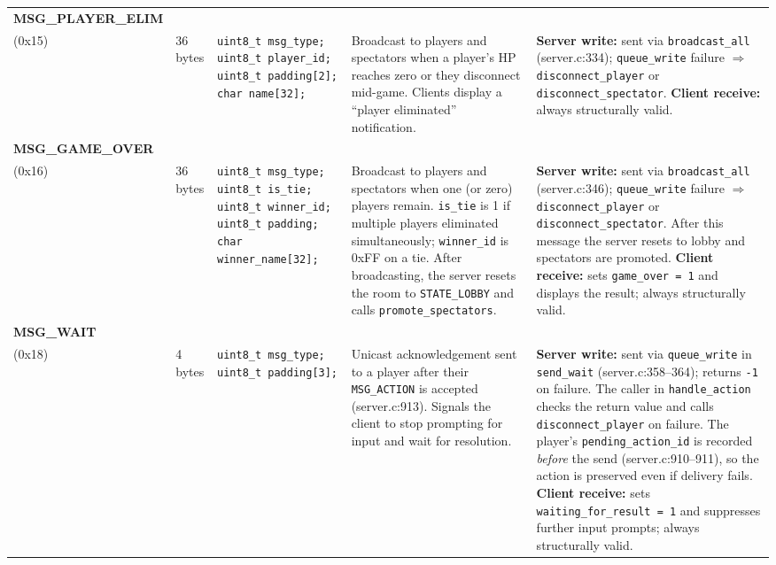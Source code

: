 \documentclass[11pt,letterpaper]{article}
\begin{document}
\begin{longtable}{@{}p{1.8cm} p{1.2cm} p{2.4cm} p{4.2cm} p{4.8cm}@{}}
\textbf{MSG\_PLAYER\_ELIM}\\(0x15) &
36 bytes &
\texttt{uint8\_t msg\_type;}\newline
\texttt{uint8\_t player\_id;}\newline
\texttt{uint8\_t padding[2];}\newline
\texttt{char name[32];} &
Broadcast to players and spectators when a player's HP reaches zero or they disconnect mid-game. Clients display a ``player eliminated'' notification. &
\textbf{Server write:} sent via \texttt{broadcast\_all} (server.c:334); \texttt{queue\_write} failure $\Rightarrow$ \texttt{disconnect\_player} or \texttt{disconnect\_spectator}. \textbf{Client receive:} always structurally valid. \\[4pt]

\textbf{MSG\_GAME\_OVER}\\(0x16) &
36 bytes &
\texttt{uint8\_t msg\_type;}\newline
\texttt{uint8\_t is\_tie;}\newline
\texttt{uint8\_t winner\_id;}\newline
\texttt{uint8\_t padding;}\newline
\texttt{char winner\_name[32];} &
Broadcast to players and spectators when one (or zero) players remain. \texttt{is\_tie} is 1 if multiple players eliminated simultaneously; \texttt{winner\_id} is 0xFF on a tie. After broadcasting, the server resets the room to \texttt{STATE\_LOBBY} and calls \texttt{promote\_spectators}. &
\textbf{Server write:} sent via \texttt{broadcast\_all} (server.c:346); \texttt{queue\_write} failure $\Rightarrow$ \texttt{disconnect\_player} or \texttt{disconnect\_spectator}. After this message the server resets to lobby and spectators are promoted. \textbf{Client receive:} sets \texttt{game\_over = 1} and displays the result; always structurally valid. \\[4pt]
\newpage

\textbf{MSG\_WAIT}\\(0x18) &
4 bytes &
\texttt{uint8\_t msg\_type;}\newline
\texttt{uint8\_t padding[3];} &
Unicast acknowledgement sent to a player after their \texttt{MSG\_ACTION} is accepted (server.c:913). Signals the client to stop prompting for input and wait for resolution. &
\textbf{Server write:} sent via \texttt{queue\_write} in \texttt{send\_wait} (server.c:358--364); returns \texttt{-1} on failure. The caller in \texttt{handle\_action} checks the return value and calls \texttt{disconnect\_player} on failure. The player's \texttt{pending\_action\_id} is recorded \emph{before} the send (server.c:910--911), so the action is preserved even if delivery fails. \textbf{Client receive:} sets \texttt{waiting\_for\_result = 1} and suppresses further input prompts; always structurally valid. \\[4pt]


\end{longtable}
\end{document}
